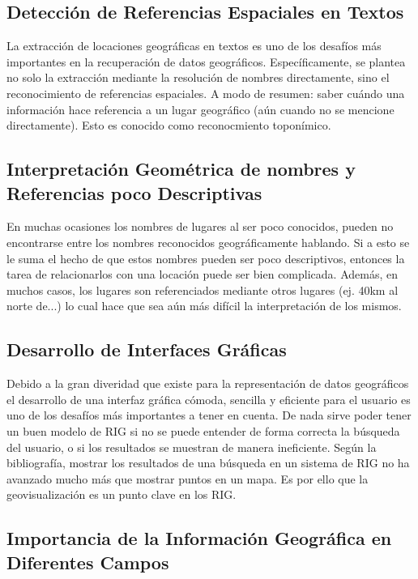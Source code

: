 \documentclass{llncs}
\begin{document}
\subsection{Detección de Referencias Espaciales en Textos}\label{sec:detect}

La extracción de locaciones geográficas en textos es uno de los desafíos más
importantes en la recuperación de datos geográficos. Específicamente, se plantea
no solo la extracción mediante la resolución de nombres directamente, sino
el reconocimiento de referencias espaciales. A modo de resumen: saber cuándo una
información hace referencia a un lugar geográfico (aún cuando no se mencione
directamente). Esto es conocido como reconocmiento toponímico.

\subsection{Interpretación Geométrica de nombres y Referencias poco
Descriptivas}\label{sec:geom}

En muchas ocasiones los nombres de lugares al ser poco conocidos, pueden no
encontrarse entre los nombres reconocidos geográficamente hablando. Si a esto
se le suma el hecho de que estos nombres pueden ser poco descriptivos, entonces
la tarea de relacionarlos con una locación puede ser bien complicada. Además,
en muchos casos, los lugares son referenciados mediante otros lugares (ej. 
40km al norte de...) lo cual hace que sea aún más difícil la interpretación de
los mismos.

\subsection{Desarrollo de Interfaces Gráficas}\label{sec:gui}

Debido a la gran diveridad que existe para la representación de datos
geográficos el desarrollo de una interfaz gráfica cómoda, sencilla y eficiente
para el usuario es uno de los desafíos más importantes a tener en cuenta. De
nada sirve poder tener un buen modelo de RIG si no se puede entender de forma
correcta la búsqueda del usuario, o si los resultados se muestran de manera
ineficiente. Según la bibliografía, mostrar los resultados de una búsqueda en
un sistema de RIG no ha avanzado mucho más que mostrar puntos en un mapa. Es
por ello que la geovisualización es un punto clave en los RIG.


\subsection{Importancia de la Información Geográfica en Diferentes
Campos}\label{sec:import}
\end{document}
